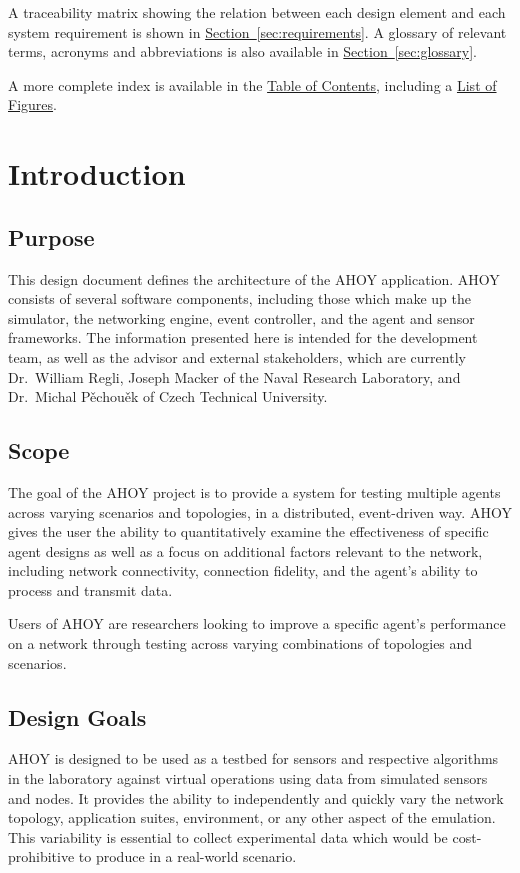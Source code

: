 \documentclass[titlepage]{article}
\newcommand{\rrref}[2]{\hyperref[#2]{#1}}
\newcommand{\sref}[1]{\hyperref[#1]{Section~\ref*{#1}}}
\begin{document}
A traceability matrix showing the relation between each design element and each system requirement is shown in \sref{sec:requirements}. A glossary of relevant terms, acronyms and abbreviations is also available in \sref{sec:glossary}.

A more complete index is available in the \rrref{Table of Contents}{toc}, including a \rrref{List of Figures}{lof}. 

\section{Introduction}
\label{sec:introduction}
\subsection{Purpose}
\label{sec:purpose}
This design document defines the architecture of the AHOY application. AHOY consists of several software components, including those which make up the simulator, the networking engine, event controller, and the agent and sensor frameworks. The information presented here is intended for the development team, as well as the advisor and external stakeholders, which are currently Dr.~William Regli, Joseph Macker of the Naval Research Laboratory, and Dr.~Michal P\v{e}chou\v{e}k of Czech Technical University. 

\subsection{Scope}
The goal of the AHOY project is to provide a system for testing multiple agents across varying scenarios and topologies, in a distributed, event-driven way. AHOY gives the user the ability to quantitatively examine the effectiveness of specific agent designs as well as a focus on additional factors relevant to the network, including network connectivity, connection fidelity, and the agent's ability to process and transmit data.

Users of AHOY are researchers looking to improve a specific agent's performance on a network through testing across varying combinations of topologies and scenarios.

\subsection{Design Goals}
AHOY is designed to be used as a testbed for sensors and respective algorithms in the laboratory against virtual operations using data from simulated sensors and nodes. It provides the ability to independently and quickly vary the network topology, application suites, environment, or any other aspect of the emulation. This variability is essential to collect experimental data which would be cost-prohibitive to produce in a real-world scenario. 
\end{document}
